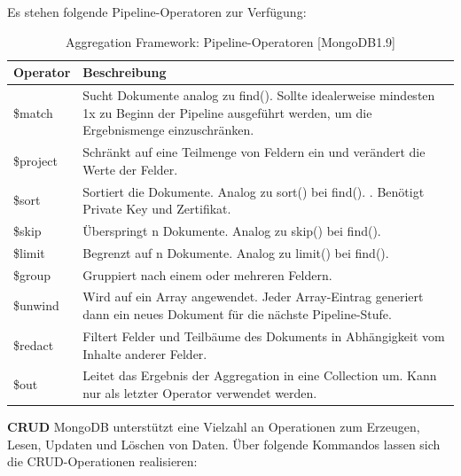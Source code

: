 Es stehen folgende Pipeline-Operatoren zur Verfügung:

 

\begin{table}[htb]
\begin{center}
    \begin{tabular}{| l | p{14cm} |}
    \hline
    \textbf{Operator}  & \textbf{Beschreibung} \\ \hline
    \$match &Sucht Dokumente analog zu find(). Sollte idealerweise mindesten 1x zu Beginn der Pipeline ausgeführt werden, um die Ergebnismenge einzuschränken.\\
    
    \hline
    \$project & Schränkt auf eine Teilmenge von Feldern ein und verändert die Werte der Felder.  \\
    
    \hline
	\$sort & Sortiert die Dokumente. Analog zu sort() bei find(). .\newline
	Benötigt Private Key und Zertifikat.  \\
	
    \hline    
    \$skip & Überspringt n Dokumente. Analog zu skip() bei find().  \\ 
    
    \hline    
    \$limit &Begrenzt auf n Dokumente. Analog zu limit() bei find().  \\
    \hline 
   \$group   &	Gruppiert nach einem oder mehreren Feldern. \\ 
\$unwind  &	Wird auf ein Array angewendet. Jeder Array-Eintrag generiert dann ein neues Dokument für die nächste Pipeline-Stufe.\\ 
\hline  
\$redact  &	Filtert Felder und Teilbäume des Dokuments in Abhängigkeit vom Inhalte anderer Felder.\\ 
\hline  
\$out  &	Leitet das Ergebnis der Aggregation in eine Collection um. Kann nur als letzter Operator verwendet werden.  \\ 
    
    \hline
    \end{tabular}
\end{center}
\caption{Aggregation Framework: Pipeline-Operatoren [MongoDB1.9]}
\end{table}

\textbf{CRUD}
\newline
MongoDB unterstützt eine Vielzahl an Operationen zum Erzeugen, Lesen, Updaten und Löschen von Daten.
Über folgende Kommandos lassen sich die CRUD-Operationen realisieren:
\newline


